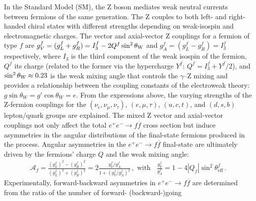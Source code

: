 \documentclass{moriond}
\newcommand{\epem}{e^+e^-}
\providecommand{\ffbar}{f\overline{f}}
\newcommand{\weakang}  {\sin^2\theta_{\rm W}}
\begin{document}
In the Standard Model (SM), the Z boson mediates weak neutral currents between fermions of
the same generation. The Z couples to both left- and right-handed chiral states with different 
strengths depending on weak-isospin and electromagnetic charges. The vector 
and axial-vector Z couplings for a fermion of type $f$ are $g^f_V = (g_L^f + g_R^f) = I_3^f - 2Q^f\weakang$ 
and $g^f_A = (g_L^f -g_R^f) = I_3^f$ respectively, where $I_3$ is the third component of the weak isospin of the fermion, 
$Q^f$ its charge (related to the former via the hypercharge $Y^f$: $Q^f=I_3^f+Y^f/2$), and $\weakang\approx 0.23$ 
is the weak mixing angle %
that controls the $\gamma$--Z mixing and provides a relationship between
the coupling constants of the electroweak theory: $g\sin\theta_W=g'\cos\theta_W=e$.
From the expressions above, the varying strengths of the Z-fermion couplings for the
$(\nu_e,\nu_\mu,\nu_\tau)$, $(e,\mu,\tau)$, $(u,c,t)$, and $(d,s,b)$ lepton/quark groups are explained.
The mixed Z vector and axial-vector couplings not only affect the total $\epem\to\ffbar$ cross section but
induce asymmetries in the angular distributions of the final-state fermions produced 
in the process. %
Angular asymmetries in the $\epem\to\ffbar$ final-state are ultimately driven by the fermions' charge $Q$ and the weak mixing angle:
\begin{eqnarray}
\mathcal{A}_f=\frac{(g_{L}^f)^2-(g_{R}^f)^2}{(g_{L}^f)^2+(g_{R}^f)^2}=2\frac{g_{V}^f/g_{A}^f}{1+(g_{V}^f/g_{A}^f)^2}\,,
\mbox{ with }\;\;\frac{g_{V}^f}{g_{A}^f}=1-4|Q_f|\sin^2\theta^f_{\mbox{eff}}\,.
\end{eqnarray}
Experimentally, forward-backward asymmetries in $\epem\to\ffbar$ are determined from the ratio of the number of forward- (backward-)going
\end{document}
